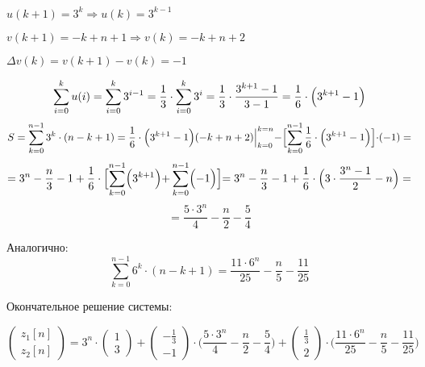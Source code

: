 $u(k+1) = 3^k \Rightarrow u(k) = 3^{k-1}$

$v(k+1) = -k + n + 1 \Rightarrow v(k) = -k + n + 2$

$\Delta v(k) = v(k+1) - v(k) = -1$

\begin{displaymath}
\sum_{i=0}^{k} u(i) = \sum_{i=0}^{k} 3^{i-1} = \frac{1}{3} \cdot \sum_{i=0}^{k} 3^{i} = \frac{1}{3} \cdot \frac{3^{k+1}-1}{3 - 1} = \frac{1}{6} \cdot \Bigl ( 3^{k+1} - 1 \Bigl )
\end{displaymath}
\begin{displaymath}
S = \sum_{k=0}^{n-1} 3^{k} \cdot (n - k + 1) = \frac{1}{6} \cdot \Bigl ( 3^{k+1} - 1 \Bigl ) (-k + n + 2) \Bigl |_{k=0}^{k=n} - \Bigl [ \sum_{k=0}^{n-1}  \frac{1}{6} \cdot \Bigl ( 3^{k+1} - 1 \Bigl ) \Bigl ] \cdot (-1) =
\end{displaymath}
\begin{displaymath}
= 3^n - \frac{n}{3} - 1 + \frac{1}{6} \cdot \Bigl [ \sum_{k=0}^{n-1} \Bigl ( 3^{k+1} \Bigl ) + \sum_{k=0}^{n-1} \Bigl ( - 1 \Bigl ) \Bigl ] = 3^n - \frac{n}{3} - 1 + \frac{1}{6} \cdot \Big (  3 \cdot \frac{3^n - 1}{2} - n \Big ) =
\end{displaymath}
\begin{displaymath}
= \frac{5 \cdot 3^n}{4} - \frac{n}{2} - \frac{5}{4}
\end{displaymath}

Аналогично:
\begin{displaymath}
\sum_{k=0}^{n-1} 6^k \cdot (n-k+1) = \frac{11 \cdot 6^n}{25} - \frac{n}{5} - \frac{11}{25}
\end{displaymath}

Окончательное решение системы:

\begin{displaymath}
\begin{pmatrix}
z_1[n]
\\
z_2[n]
\end{pmatrix} = 3^n \cdot \begin{pmatrix}
1
\\
3
\end{pmatrix} + \begin{pmatrix}
- \frac{1}{3}
\\
- 1
\end{pmatrix} \cdot \Big ( \frac{5 \cdot 3^n}{4} - \frac{n}{2} - \frac{5}{4} \Big ) + \begin{pmatrix}
\frac{1}{3}
\\
2
\end{pmatrix} \cdot \Big ( \frac{11 \cdot 6^n}{25} - \frac{n}{5} - \frac{11}{25} \Big )
\end{displaymath}

